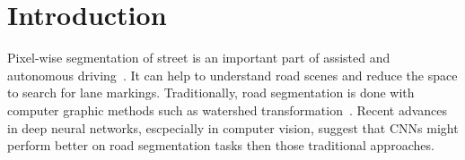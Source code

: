 
\section{Introduction}
Pixel-wise segmentation of street is an important part of assisted and
autonomous driving~\cite{Tarel2009}. It can help to understand road scenes and
reduce the space to search for lane markings. Traditionally, road segmentation
is done with computer graphic methods such as watershed
transformation~\cite{Beucher1990}. Recent advances in deep neural networks,
escpecially in computer vision, suggest that \glspl{CNN} might perform better
on road segmentation tasks then those traditional approaches.